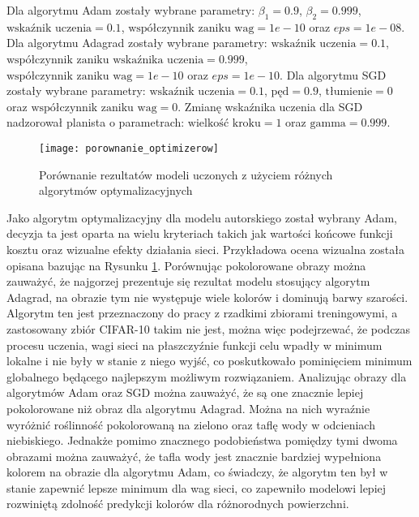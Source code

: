   \noindent
  Dla algorytmu Adam zostały wybrane parametry: $\beta_{1} = 0.9$, $\beta_{2} = 0.999$,
  $\text{wskaźnik uczenia} = 0.1$, $\text{współczynnik zaniku wag} = 1e-10$ oraz
  $eps=1e-08$.
  \newline
  Dla algorytmu Adagrad zostały wybrane parametry: $\text{wskaźnik uczenia} = 0.1$,
  $\text{współczynnik zaniku wskaźnika uczenia} = 0.999$,
  $\text{współczynnik zaniku wag} = 1e-10$ oraz $eps=1e-10$.
  \newline
  Dla algorytmu SGD zostały wybrane parametry: $\text{wskaźnik uczenia} = 0.1$,
  $\text{pęd} = 0.9$, $\text{tłumienie} = 0$ oraz $\text{współczynnik zaniku wag} = 0$.
  Zmianę wskaźnika uczenia dla SGD nadzorował planista o parametrach:
  $\text{wielkość kroku} = 1$ oraz $\text{gamma} = 0.999$.


  \begin{figure}[H]
   \centering
   \captionsetup{justification=centering}
   \texttt{[image: porownanie\_optimizerow]}
   \caption[Porównanie rezultatów modeli uczonych z użyciem różnych algorytmów
   optymalizacyjnych - źródło rysunek własny na podstawie: \url{https://cdn.thearthunters.com/wp-content/uploads/2013/06/bg-960x636.jpg}]
   {Porównanie rezultatów modeli uczonych z użyciem różnych algorytmów
   optymalizacyjnych}
   \label{fig:porownanie_optimizerow}
  \end{figure}

  \noindent
  Jako algorytm optymalizacyjny dla modelu autorskiego został wybrany Adam,
  decyzja ta jest oparta na wielu kryteriach takich jak wartości końcowe funkcji
  kosztu oraz wizualne efekty działania sieci. Przykładowa ocena wizualna
  została opisana bazując na Rysunku \ref{fig:porownanie_optimizerow}.
  Porównując pokolorowane obrazy można zauważyć, że najgorzej prezentuje się
  rezultat modelu stosujący algorytm Adagrad, na obrazie tym nie występuje wiele
  kolorów i dominują barwy szarości. Algorytm ten jest przeznaczony do
  pracy z rzadkimi zbiorami treningowymi, a zastosowany zbiór CIFAR-10 takim nie
  jest, można więc podejrzewać, że podczas procesu uczenia, wagi sieci na
  płaszczyźnie funkcji celu wpadły w minimum lokalne i nie były w stanie z niego
  wyjść, co poskutkowało pominięciem minimum globalnego będącego najlepszym
  możliwym rozwiązaniem. Analizując obrazy dla algorytmów Adam oraz SGD
  można zauważyć, że są one znacznie lepiej pokolorowane niż obraz dla
  algorytmu Adagrad. Można na nich wyraźnie wyróżnić roślinność pokolorowaną
  na zielono oraz taflę wody w odcieniach niebiskiego. Jednakże pomimo
  znacznego podobieństwa pomiędzy tymi dwoma obrazami można zauważyć, że tafla
  wody jest znacznie bardziej wypełniona kolorem na obrazie dla algorytmu Adam,
  co świadczy, że algorytm ten był w stanie zapewnić lepsze minimum dla wag
  sieci, co zapewniło modelowi lepiej rozwiniętą zdolność predykcji kolorów dla
  różnorodnych powierzchni.

